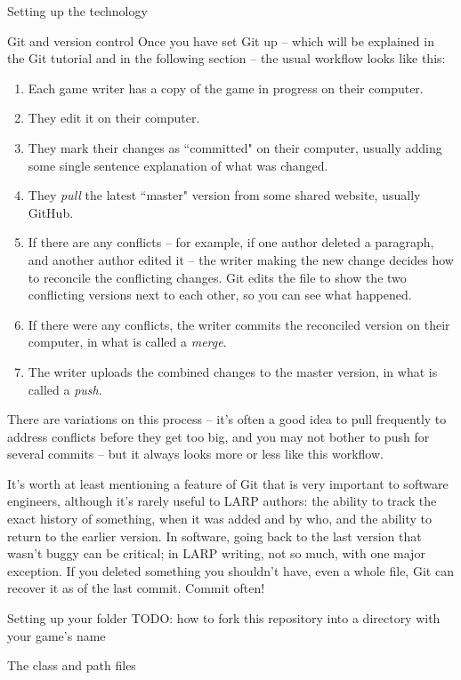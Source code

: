 \documentclass[sheet]{GameTexBase}
\begin{document}
\begin{section}{Setting up the technology}
\begin{subsection}{Git and version control}
Once you have set Git up -- which will be explained in the Git tutorial and in the following section -- the usual workflow looks like this:
\begin{enumerate}
\item Each game writer has a copy of the game in progress on their computer.
\item They edit it on their computer.
\item They mark their changes as ``committed" on their computer, usually adding some single sentence explanation of what was changed.
\item They \textit{pull} the latest ``master" version from some shared website, usually GitHub.  
\item If there are any conflicts – for example, if one author deleted a paragraph, and another author edited it – the writer making the new change decides how to reconcile the conflicting changes.  Git edits the file to show the two conflicting versions next to each other, so you can see what happened.
\item If there were any conflicts, the writer commits the reconciled version on their computer, in what is called a \textit{merge}.
\item The writer uploads the combined changes to the master version, in what is called a \textit{push}.
\end{enumerate}

There are variations on this process -- it's often a good idea to pull frequently to address conflicts before they get too big, and you may not bother to push for several commits -- but it always looks more or less like this workflow.

It's worth at least mentioning a feature of Git that is very important to software engineers, although it's rarely useful to LARP authors: the ability to track the exact history of something, when it was added and by who, and the ability to return to the earlier version.  In software, going back to the last version that wasn't buggy can be critical; in LARP writing, not so much, with one major exception.  If you deleted something you shouldn't have, even a whole file, Git can recover it as of the last commit.  Commit often!
\end{subsection}
\begin{subsection}{Setting up your \gametex{} folder}
TODO: how to fork this repository into a directory with your game's name
\begin{subsubsection}{The class and path files}
\end{subsubsection}
\end{subsection}
\end{section}
\end{document}
